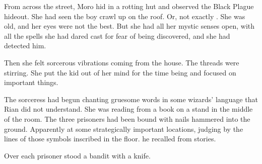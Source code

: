 \begin{comment}
\subsection{Moro Cornel observes}
\end{comment}
\new
From across the street, Moro \Cornel{} hid in a rotting hut and observed the Black Plague hideout. 
She had seen the \human{} boy crawl up on the roof. 
Or, not exactly . 
She was old, and her eyes were not the best. 
But she had all her mystic senses open, with all the spells she had dared cast for fear of being discovered, and she had detected him. 


Then she felt sorcerous vibrations coming from the house. 
The threads were stirring. 
She put the kid out of her mind for the time being and focused on important things. 








\begin{comment}
\subsection{Sacrifice}
\end{comment}
\new
The sorceress had begun chanting gruesome words in some wizards' language that Rian did not understand. 
She was reading from a book on a stand in the middle of the room. 
The three prisoners had been bound with nails hammered into the ground. 
Apparently at some strategically important locations, judging by the lines of those symbols inscribed in the floor. 
 he recalled from stories.

Over each prisoner stood a bandit with a knife.

